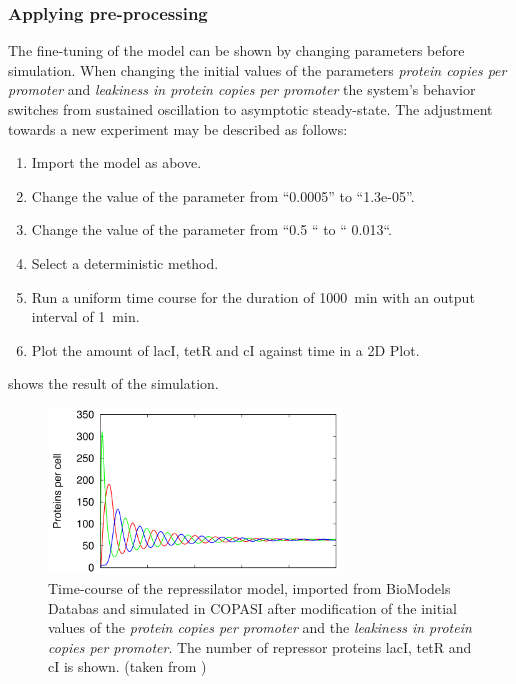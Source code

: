 \subsubsection{Applying pre-processing}
The fine-tuning of the model can be shown by changing parameters before simulation. When changing the initial values of the parameters \emph{protein copies per promoter} and \emph{leakiness in protein copies per promoter} the system's behavior switches from sustained oscillation to asymptotic steady-state. The adjustment towards a new experiment may be described as follows:  
\begin{enumerate}
\item{Import the model as above.}
\item{Change the value of the parameter  from “0.0005” to “1.3e-05”. }
\item{Change the value of the parameter  from “0.5 “ to “ 0.013“.}
\item{Select a deterministic method.}
\item{Run a uniform time course for the duration of 1000~min with an output interval of 1~min.}
\item Plot the amount of lacI, tetR and cI against time in a 2D Plot.
\end{enumerate}
 shows the result of the simulation.
%
\begin{figure}
\centering
\includegraphics[width=0.7\textwidth]{images/simEx3.png}
\caption{Time-course of the repressilator model, imported from BioModels Databas and simulated in COPASI after modification of the initial values of the \emph{protein copies per promoter} and the \emph{leakiness in protein copies per promoter}. The number of repressor proteins lacI, tetR and cI is shown. (taken from \citep{Waltemath:2010})}
\label{fig:simEx3}
\end{figure}


